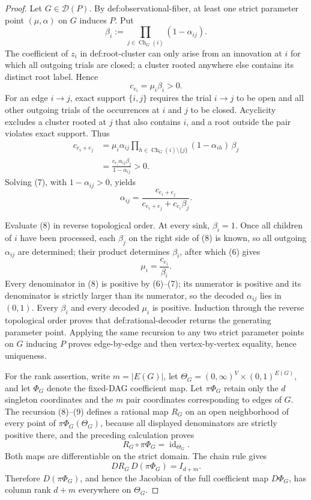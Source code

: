 \documentclass{article}
\begin{document}
\begin{proof}
Let \(G\in\mathcal D(P)\).  By def:observational-fiber, at least one strict parameter point \((\mu,\alpha)\) on \(G\) induces \(P\).  Put
\[
 \beta_i:=\prod_{j\in\operatorname{Ch}_G(i)}(1-\alpha_{ij}).
\]
The coefficient of \(z_i\) in def:root-cluster can only arise from an innovation at \(i\) for which all outgoing trials are closed; a cluster rooted anywhere else contains its distinct root label.  Hence
\[
 c_{e_i}=\mu_i\beta_i>0.
\tag{6}
\]
For an edge \(i\to j\), exact support \(\{i,j\}\) requires the trial \(i\to j\) to be open and all other outgoing trials of the occurrences at \(i\) and \(j\) to be closed.  Acyclicity excludes a cluster rooted at \(j\) that also contains \(i\), and a root outside the pair violates exact support.  Thus
\[
 \begin{aligned}
 c_{e_i+e_j}
 &=\mu_i\alpha_{ij}
   \prod_{h\in\operatorname{Ch}_G(i)\setminus\{j\}}(1-\alpha_{ih})\,\beta_j\\
 &=\frac{c_{e_i}\alpha_{ij}\beta_j}{1-\alpha_{ij}}>0.
 \end{aligned}
\tag{7}
\]
Solving (7), with \(1-\alpha_{ij}>0\), yields
\[
 \alpha_{ij}
 =\frac{c_{e_i+e_j}}
        {c_{e_i+e_j}+c_{e_i}\beta_j}.
\tag{8}
\]

Evaluate (8) in reverse topological order.  At every sink, \(\beta_i=1\).  Once all children of \(i\) have been processed, each \(\beta_j\) on the right side of (8) is known, so all outgoing \(\alpha_{ij}\) are determined; their product determines \(\beta_i\), after which (6) gives
\[
 \mu_i=\frac{c_{e_i}}{\beta_i}.
\tag{9}
\]
Every denominator in (8) is positive by (6)--(7); its numerator is positive and its denominator is strictly larger than its numerator, so the decoded \(\alpha_{ij}\) lies in \((0,1)\).  Every \(\beta_i\) and every decoded \(\mu_i\) is positive.  Induction through the reverse topological order proves that def:rational-decoder returns the generating parameter point.  Applying the same recursion to any two strict parameter points on \(G\) inducing \(P\) proves edge-by-edge and then vertex-by-vertex equality, hence uniqueness.

For the rank assertion, write \(m=|E(G)|\), let \(\Theta_G=(0,\infty)^V\times(0,1)^{E(G)}\), and let \(\Phi_G\) denote the fixed-DAG coefficient map.  Let \(\pi\Phi_G\) retain only the \(d\) singleton coordinates and the \(m\) pair coordinates corresponding to edges of \(G\).  The recursion (8)--(9) defines a rational map \(R_G\) on an open neighborhood of every point of \(\pi\Phi_G(\Theta_G)\), because all displayed denominators are strictly positive there, and the preceding calculation proves
\[
 R_G\circ\pi\Phi_G=\operatorname{id}_{\Theta_G}.
\]
Both maps are differentiable on the strict domain.  The chain rule gives
\[
 D R_G\,D(\pi\Phi_G)=I_{d+m}.
\]
Therefore \(D(\pi\Phi_G)\), and hence the Jacobian of the full coefficient map \(D\Phi_G\), has column rank \(d+m\) everywhere on \(\Theta_G\).
\end{proof}
\end{document}

